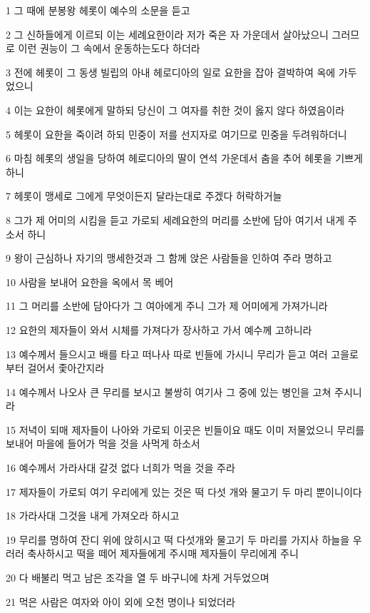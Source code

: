 \par 1 그 때에 분봉왕 헤롯이 예수의 소문을 듣고
\par 2 그 신하들에게 이르되 이는 세례요한이라 저가 죽은 자 가운데서 살아났으니 그러므로 이런 권능이 그 속에서 운동하는도다 하더라
\par 3 전에 헤롯이 그 동생 빌립의 아내 헤로디아의 일로 요한을 잡아 결박하여 옥에 가두었으니
\par 4 이는 요한이 헤롯에게 말하되 당신이 그 여자를 취한 것이 옳지 않다 하였음이라
\par 5 헤롯이 요한을 죽이려 하되 민중이 저를 선지자로 여기므로 민중을 두려워하더니
\par 6 마침 헤롯의 생일을 당하여 헤로디아의 딸이 연석 가운데서 춤을 추어 헤롯을 기쁘게 하니
\par 7 헤롯이 맹세로 그에게 무엇이든지 달라는대로 주겠다 허락하거늘
\par 8 그가 제 어미의 시킴을 듣고 가로되 세례요한의 머리를 소반에 담아 여기서 내게 주소서 하니
\par 9 왕이 근심하나 자기의 맹세한것과 그 함께 앉은 사람들을 인하여 주라 명하고
\par 10 사람을 보내어 요한을 옥에서 목 베어
\par 11 그 머리를 소반에 담아다가 그 여아에게 주니 그가 제 어미에게 가져가니라
\par 12 요한의 제자들이 와서 시체를 가져다가 장사하고 가서 예수께 고하니라
\par 13 예수께서 들으시고 배를 타고 떠나사 따로 빈들에 가시니 무리가 듣고 여러 고을로부터 걸어서 좇아간지라
\par 14 예수께서 나오사 큰 무리를 보시고 불쌍히 여기사 그 중에 있는 병인을 고쳐 주시니라
\par 15 저녁이 되매 제자들이 나아와 가로되 이곳은 빈들이요 때도 이미 저물었으니 무리를 보내어 마을에 들어가 먹을 것을 사먹게 하소서
\par 16 예수께서 가라사대 갈것 없다 너희가 먹을 것을 주라
\par 17 제자들이 가로되 여기 우리에게 있는 것은 떡 다섯 개와 물고기 두 마리 뿐이니이다
\par 18 가라사대 그것을 내게 가져오라 하시고
\par 19 무리를 명하여 잔디 위에 앉히시고 떡 다섯개와 물고기 두 마리를 가지사 하늘을 우러러 축사하시고 떡을 떼어 제자들에게 주시매 제자들이 무리에게 주니
\par 20 다 배불리 먹고 남은 조각을 열 두 바구니에 차게 거두었으며
\par 21 먹은 사람은 여자와 아이 외에 오천 명이나 되었더라
